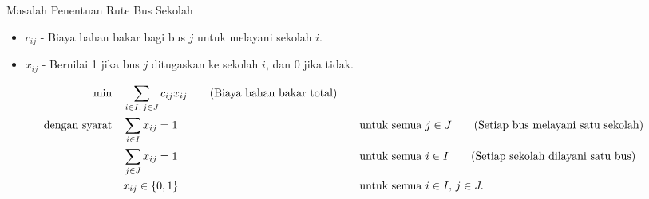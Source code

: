 \begin{examplewithallcode}{Masalah Penentuan Rute Bus Sekolah}
\begin{itemize}
    \item \(c_{ij} \) - Biaya bahan bakar bagi bus \(j\) untuk melayani sekolah \(i\).
\end{itemize}

\begin{itemize}
    \item \(x_{ij} \) - Bernilai 1 jika bus \(j\) ditugaskan ke sekolah \(i\), dan 0 jika tidak.
\end{itemize}

\begin{align*}
\min \quad & \sum_{i \in I,\, j \in J} c_{ij} x_{ij}   \tag{Biaya bahan bakar total} \\
\mbox{dengan syarat}\quad        & \sum_{i \in I} x_{ij} = 1 &&\quad \mbox{untuk semua } j \in J   \tag{Setiap bus melayani satu sekolah} \\
             & \sum_{j \in J} x_{ij} = 1 &&\quad \mbox{untuk semua } i \in I   \tag{Setiap sekolah dilayani satu bus} \\
             & x_{ij} \in \{0,1\} &&\quad \mbox{untuk semua } i \in I,\, j \in J.
\end{align*}
\end{examplewithallcode}

